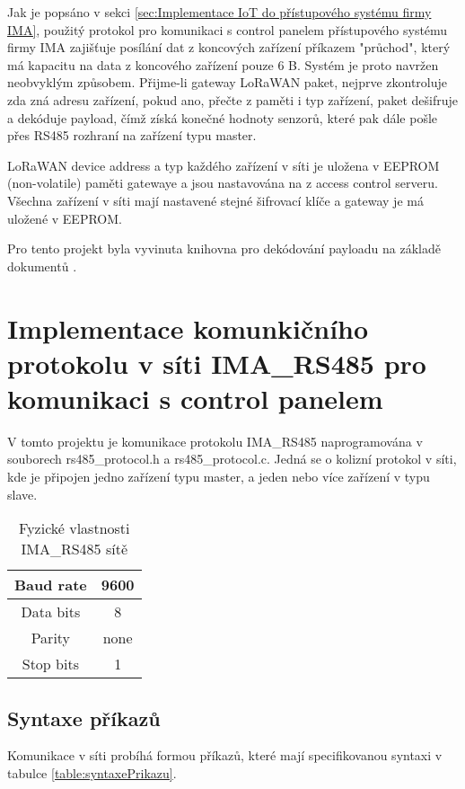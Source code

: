 Jak je popsáno v sekci \ref{sec:Implementace IoT do přístupového systému firmy IMA}, 
použitý protokol pro komunikaci s control panelem přístupového systému firmy IMA zajišťuje posílání dat z koncových zařízení příkazem "průchod", 
který má kapacitu na data z koncového zařízení pouze 6 B. 
Systém je proto navržen neobvyklým způsobem. 
Přijme-li gateway LoRaWAN paket, nejprve zkontroluje zda zná adresu zařízení, pokud ano, přečte z paměti i typ zařízení,
 paket dešifruje a dekóduje payload, čímž získá konečné hodnoty senzorů, které pak dále pošle přes RS485 rozhraní na zařízení typu master.

LoRaWAN device address a typ každého zařízení v síti je uložena v EEPROM (non-volatile) paměti gatewaye a jsou nastavována na z access control serveru.
Všechna zařízení v síti mají nastavené stejné šifrovací klíče a gateway je má uložené v EEPROM.

Pro tento projekt byla vyvinuta knihovna pro dekódování payloadu na základě dokumentů \cite{lwSpec} \cite{lwSecur}.


\section{Implementace komunkičního protokolu v síti IMA\_RS485 pro komunikaci s control panelem}
V tomto projektu je komunikace protokolu IMA\_RS485 naprogramována v souborech rs485\_protocol.h a rs485\_protocol.c. 
Jedná se o kolizní protokol v síti, kde je připojen jedno zařízení typu master, a jeden nebo více zařízení v typu slave.

\begin{table}[!h]
    \centering
    \begin{tabular}{ |c|c| }
     \hline

     Baud rate              & 9600           \\ \hline
     Data bits              & 8                 \\ \hline
     Parity                 & none              \\ \hline
     Stop bits              & 1                 \\ \hline

    \end{tabular}
    \caption{Fyzické vlastnosti IMA\_RS485 sítě}
    \label{table:3}
\end{table}

\newpage
\subsection{Syntaxe příkazů}
Komunikace v síti probíhá formou příkazů, které mají specifikovanou syntaxi v tabulce \ref{table:syntaxePrikazu}.

